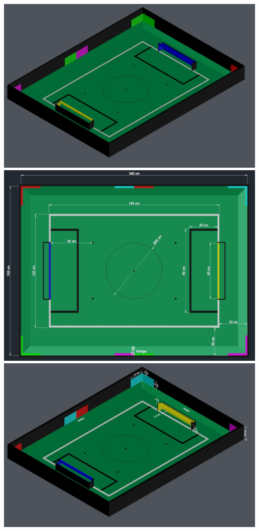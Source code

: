 \documentclass{article}
\begin{document}
\includegraphics[width=1\textwidth]{media/image5.jpeg}
\includegraphics[width=1\textwidth]{media/image6.jpeg}
\includegraphics[width=1\textwidth]{media/image7.jpeg}
\end{document}
